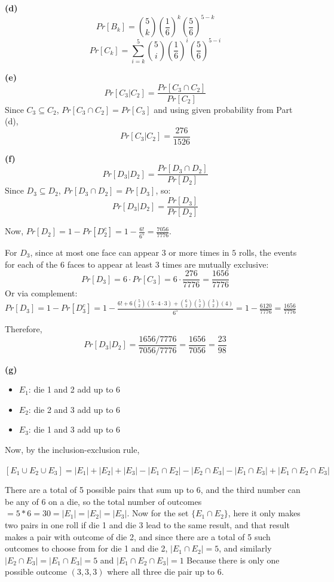\documentclass{article}
\begin{document}
\vspace{\baselineskip}
\noindent\textbf{(d)}
\[Pr[B_k] = \binom{5}{k} \left(\frac{1}{6}\right)^k \left(\frac{5}{6}\right)^{5-k} \]
\[Pr[C_k] = \sum_{i=k}^{5} \binom{5}{i} \left(\frac{1}{6}\right)^i \left(\frac{5}{6}\right)^{5-i} \]

\vspace{\baselineskip}
\noindent\textbf{(e)}
\[Pr[C_3 | C_2] = \frac{Pr[C_3 \cap C_2]}{Pr[C_2]}\]
Since $C_3 \subseteq C_2$, $Pr[C_3 \cap C_2] = Pr[C_3]$ and using given probability from Part (d),
\[Pr[C_3 | C_2] = \frac{276}{1526}\]

\vspace{\baselineskip}
\noindent\textbf{(f)}
\[Pr[D_3 | D_2] = \frac{Pr[D_3 \cap D_2]}{Pr[D_2]}\]
Since $D_3 \subseteq D_2$, $Pr[D_3 \cap D_2] = Pr[D_3]$, so:
\[Pr[D_3 | D_2] = \frac{Pr[D_3]}{Pr[D_2]}\]

Now, $Pr[D_2] = 1 - Pr[D_2^c] = 1 - \frac{6!}{6^5} = \frac{7056}{7776}$.

For $D_3$, since at most one face can appear $3$ or more times in $5$ rolls, the events for each of the $6$ faces to appear at least 3 times are mutually exclusive:
\[Pr[D_3] = 6 \cdot Pr[C_3] = 6 \cdot \frac{276}{7776} = \frac{1656}{7776}\]
Or via complement:
$Pr[D_3] = 1 - Pr[D_3^c] = 1 - \frac{6! + 6\binom{5}{2}(5 \cdot 4 \cdot 3) + \binom{6}{2}\binom{5}{2}\binom{3}{2}(4)}{6^5} = 1 - \frac{6120}{7776} = \frac{1656}{7776}$

Therefore,
\[Pr[D_3 | D_2] = \frac{1656 / 7776}{7056 / 7776} = \frac{1656}{7056} = \frac{23}{98}\]


\vspace{\baselineskip}
\noindent\textbf{(g)}
\begin{itemize}
    \item $E_1$: die 1 and 2 add up to 6
    \item $E_2$: die 2 and 3 add up to 6
    \item $E_3$: die 1 and 3 add up to 6
\end{itemize}
Now, by the inclusion-exclusion rule,

$[E_1 \cup E_2 \cup E_3] = |E_1| + |E_2| + |E_3| - |E_1 \cap E_2| - |E_2 \cap E_3| - |E_1 \cap E_3| + |E_1 \cap E_2 \cap E_3|$

There are a total of 5 possible pairs that sum up to 6, and the third number can be any of 6 on a die, so the total number of outcomes $= 5 * 6 = 30 = |E_1| = |E_2| = |E_3|$.
Now for the set $\{E_1 \cap E_2\}$, here it only makes two pairs in one roll if die 1 and die 3 lead to the same result, and that result makes a pair with
outcome of die 2, and since there are a total of 5 such outcomes to choose from for die 1 and die 2, $|E_1 \cap E_2| = 5$, and similarly $|E_2 \cap E_3| = |E_1 \cap E_3| = 5$
and $|E_1 \cap E_2 \cap E_3| = 1$ Because there is only one possible outcome $(3,3,3)$ where all three die pair up to 6.
\end{document}
